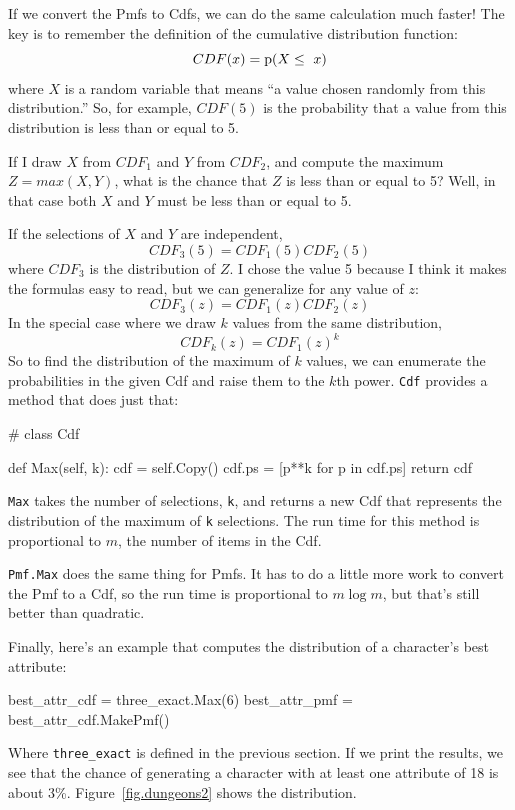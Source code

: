 \documentclass[12pt]{book}
\theoremstyle{exercise}
\begin{document}
If we convert the Pmfs to Cdfs, we can do the same calculation
much faster!  The key is to remember the definition of the
cumulative distribution function:
%
\[ CDF(x) = \mathrm{p}(X \le~x) \]
%
where $X$ is a random variable that means ``a value chosen
randomly from this distribution.''  So, for example, $CDF(5)$
is the probability that a value from this distribution is less
than or equal to 5.

If I draw $X$ from $CDF_1$ and $Y$ from $CDF_2$, and compute
the maximum $Z = max(X, Y)$, what is the chance that $Z$ is
less than or equal to 5?  Well, in that case both $X$ and $Y$
must be less than or equal to 5.

If the selections of $X$ and $Y$ are independent,
%
\[ CDF_3(5) = CDF_1(5) CDF_2(5) \] 
%
where $CDF_3$ is the distribution of $Z$.  I chose the value
5 because I think it makes the formulas easy to read, but we
can generalize for any value of $z$:
%
\[ CDF_3(z) = CDF_1(z) CDF_2(z) \]
%
In the special case where we draw $k$ values from the same
distribution, 
%
\[ CDF_k(z) = CDF_1(z)^k \]
%
So to find the distribution of the maximum of $k$ values,
we can enumerate the probabilities in the given Cdf
and raise them to the $k$th power.
\verb"Cdf" provides a method that does just that:

\begin{code}
# class Cdf

    def Max(self, k):
        cdf = self.Copy()
        cdf.ps = [p**k for p in cdf.ps]
        return cdf
\end{code}

\verb"Max" takes the number of selections, {\tt k}, and returns a new
Cdf that represents the distribution of the maximum of {\tt k}
selections.  The run time for this method is proportional to 
$m$, the number of items in the Cdf.

\verb"Pmf.Max" does the same thing for Pmfs.  It has to do a little
more work to convert the Pmf to a Cdf, so the run time is proportional
to $m \log m$, but that's still better than quadratic.

Finally, here's an example that computes the distribution of
a character's best attribute:

\begin{code}
    best_attr_cdf = three_exact.Max(6)
    best_attr_pmf = best_attr_cdf.MakePmf()
\end{code}

Where \verb"three_exact" is defined in the previous section.
If we print the results, we see that the chance of generating
a character with at least one attribute of 18 is about 3\%.
Figure~\ref{fig.dungeons2} shows the distribution.
\end{document}

